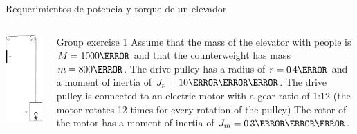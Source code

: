 \documentclass[presentation,aspectratio=169]{beamer}
\begin{document}
\begin{frame}[label={sec:org8a9e0af}]{Requerimientos de potencia y torque de un elevador}
\begin{columns}
\begin{column}{0.38\columnwidth}
\begin{center}
\includegraphics[height=0.8\textheight]{../../figures/mech-elevator}
\end{center}
\end{column}

\begin{column}{0.72\columnwidth}
\alert{Group exercise 1} Assume that the mass of the elevator with people is \(M=\unit{1000}{\kilogram}\) and that the counterweight has mass \(m=\unit{800}{\kilogram}\). The drive pulley has a radius of \(r=\unit{0.4}{\meter}\) and a moment of inertia of \(J_p = \unit{10}{\kilogram\meter\squared}\). The drive pulley is connected to an electric motor with a gear ratio of 1:12 (the motor rotates 12 times for every rotation of the pulley) The rotor of the motor has a moment of inertia of \(J_m = \unit{0.3}{\kilogram\meter\squared}\).


\end{column}
\end{columns}
\end{frame}
\end{document}
